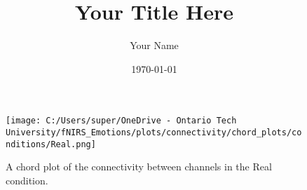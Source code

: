 \documentclass{article}
\title{Your Title Here}
\author{Your Name}
\date{\today}
\begin{document}
\begin{figure}[h]
    \centering
    \texttt{[image: C:/Users/super/OneDrive - Ontario Tech University/fNIRS\_Emotions/plots/connectivity/chord\_plots/conditions/Real.png]}
    \caption{A chord plot of the connectivity between channels in the Real condition.}
    \label{fig:real_chord}
\end{figure}
\end{document}

